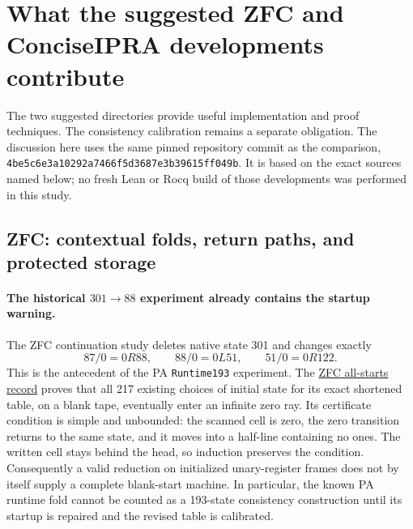 \providecommand{\TransferSource}[2]{\href{https://github.com/VladimirReshetnikov/ProveIt/blob/4be5c6e3a10292a7466f5d3687e3b39615ff049b/#1}{#2}}

\section{What the suggested ZFC and ConciseIPRA developments contribute}
\label{sec:transferred-ideas}

The two suggested directories provide useful implementation and proof
techniques.  The consistency calibration remains a separate obligation.
The discussion here uses the same pinned repository commit as the comparison,
\texttt{4be5c6e3a10292a7466f5d3687e3b39615ff049b}.
It is based on the exact sources named below; no fresh Lean or Rocq build of
those developments was performed in this study.

\subsection{ZFC: contextual folds, return paths, and protected storage}

\paragraph{The historical $301\mathbin{\to}88$ experiment already contains
the startup warning.}
The ZFC continuation study deletes native state 301 and changes exactly
\[
  87/0=0R88,\qquad 88/0=0L51,\qquad 51/0=0R122.
\]
This is the antecedent of the PA \texttt{Runtime193} experiment.  The
\TransferSource{Computability/BusyBeaver/Research/ZFC/k218-continuation-search/all-starts/README.md}{ZFC all-starts record}
proves that all 217 existing choices of initial state for its exact shortened
table, on a blank tape, eventually enter an infinite zero ray.  Its certificate
condition is simple and unbounded: the scanned cell is zero, the zero transition
returns to the same state, and it moves into a half-line containing no ones.
The written cell stays behind the head, so induction preserves the condition.
Consequently a valid reduction on initialized unary-register frames does not
by itself supply a complete blank-start machine.  In particular, the known
PA runtime fold cannot be counted as a 193-state consistency construction
until its startup is repaired and the revised table is calibrated.

